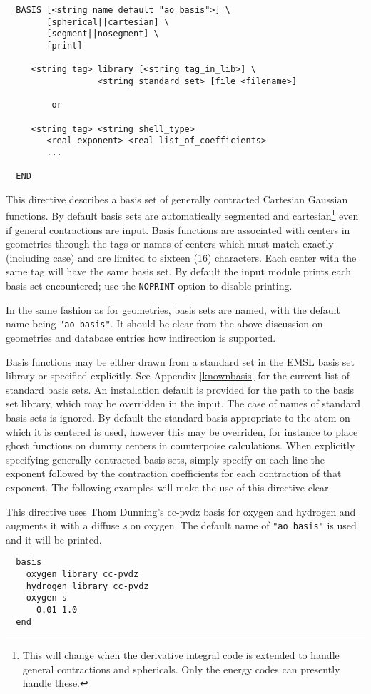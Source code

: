\label{sec:basis}
\begin{verbatim}
  BASIS [<string name default "ao basis">] \
        [spherical||cartesian] \
        [segment||nosegment] \
        [print]

     <string tag> library [<string tag_in_lib>] \
                  <string standard set> [file <filename>]

         or

     <string tag> <string shell_type>
        <real exponent> <real list_of_coefficients>
        ...
     
  END
\end{verbatim}    

This directive describes a basis set of generally contracted Cartesian
Gaussian functions.  By default basis sets are automatically segmented
and cartesian\footnote{This will change when the derivative integral
  code is extended to handle general contractions and sphericals. Only
  the energy codes can presently handle these.} even if general
contractions are input.  Basis functions are associated with centers
in geometries through the tags or names of centers which must match
exactly (including case) and are limited to sixteen (16) characters.
Each center with the same tag will have the same basis set.  By
default the input module prints each basis set encountered; use the
\verb+NOPRINT+ option to disable printing.

In the same fashion as for geometries, basis sets are named, with the
default name being \verb+"ao basis"+.  It should be clear from the
above discussion on geometries and database entries how indirection is
supported.

Basis functions may be either drawn from a standard set in the EMSL
basis set library or specified explicitly.  See Appendix
\ref{knownbasis} for the current list of standard basis sets. An
installation default is provided for the path to the basis set
library, which may be overridden in the input.  The case of names of
standard basis sets is ignored.  By default the standard basis
appropriate to the atom on which it is centered is used, however this
may be overriden, for instance to place ghost functions on dummy
centers in counterpoise calculations.  When explicitly specifying
generally contracted basis sets, simply specify on each line the
exponent followed by the contraction coefficients for each contraction
of that exponent.  The following examples will make the use of this
directive clear.

This directive uses Thom Dunning's cc-pvdz basis for oxygen and
hydrogen and augments it with a diffuse {\em s} on oxygen.
The default name of \verb+"ao basis"+ is used and it will be printed.
\begin{verbatim}
  basis
    oxygen library cc-pvdz
    hydrogen library cc-pvdz
    oxygen s
      0.01 1.0
  end
\end{verbatim}


